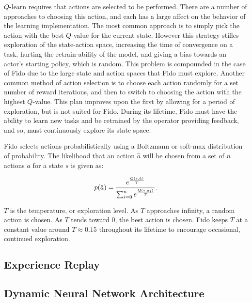 $Q$-learn requires that actions are selected to be performed.
There are a number of approaches to choosing this action, and each has a large affect on the behavior of the learning implementation.
The most common approach is to simply pick the action with the best $Q$-value for the current state.
However this strategy stifles exploration of the state-action space, increasing the time of convergence on a task, hurting the retrain-ability of the model, and giving a bias towards an actor's starting policy, which is random.
This problem is compounded in the case of Fido due to the large state and action spaces that Fido must explore.
Another common method of action selection is to choose each action randomly for a set number of reward iterations, and then to switch to choosing the action with the highest $Q$-value.
This plan improves upon the first by allowing for a period of exploration, but is not suited for Fido.
During its lifetime, Fido must have the ability to learn new tasks and be retrained by the operator providing feedback, and so, must continuously explore its state space.

Fido selects actions probabilistically using a Boltzmann or soft-max distribution of probability.
The likelihood that an action $\hat{a}$ will be chosen from a set of $n$ actions $a$ for a state $s$ is given as:

\begin{equation}
	p(\hat{a}) = \cfrac{e^{\frac{Q(s, \hat{a})}{T}}}{\sum_{i=0}^{n}e^{\frac{Q(s, a_i)}{T}}}
	\,.
	\label{equ::boltzmann}
\end{equation}

$T$ is the temperature, or exploration level.
As $T$ approaches infinity, a random action is chosen.
As $T$ tends toward 0, the best action is chosen.
Fido keeps $T$ at a constant value around $T \approx 0.15$ throughout its lifetime to encourage occasional, continued exploration.

\subsection{Experience Replay}

\subsection{Dynamic Neural Network Architecture}
